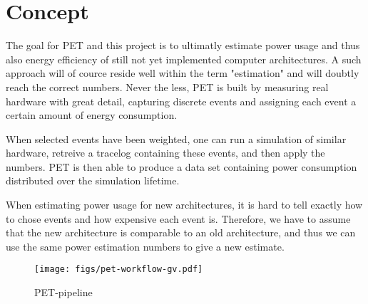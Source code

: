 \section{Concept}
The goal for PET and this project is to ultimatly estimate power usage and thus
also energy efficiency of still not yet implemented computer architectures. A
such approach will of cource reside well within the term "estimation" and will
doubtly reach the correct numbers. Never the less, PET is built by measuring
real hardware with great detail, capturing discrete events and assigning each
event a certain amount of energy consumption.

When selected events have been weighted, one can run a simulation of similar
hardware, retreive a tracelog containing these events, and then apply the
numbers. PET is then able to produce a data set containing power consumption
distributed over the simulation lifetime.

When estimating power usage for new architectures, it is hard to tell exactly
how to chose events and how expensive each event is. Therefore, we have to
assume that the new architecture is comparable to an old architecture, and thus
we can use the same power estimation numbers to give a new estimate.

\begin{figure}
    \texttt{[image: figs/pet-workflow-gv.pdf]}
    \caption{PET-pipeline}
    \label{fig:pipeline}
\end{figure}
